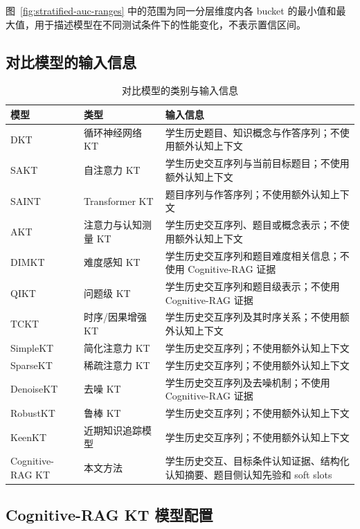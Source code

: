 \documentclass[UTF8,a4paper,12pt]{ctexart}
\numberwithin{table}{section}
\begin{document}
图~\ref{fig:stratified-auc-ranges} 中的范围为同一分层维度内各 bucket 的最小值和最大值，用于描述模型在不同测试条件下的性能变化，不表示置信区间。

\subsection{对比模型的输入信息}

\begin{table}[htbp]
\centering
\small
\caption{对比模型的类别与输入信息}
\label{tab:appendix-comparison-models}
\begin{tabularx}{\textwidth}{p{2.6cm}p{3.3cm}X}
\toprule
\textbf{模型} & \textbf{类型} & \textbf{输入信息} \\
\midrule
DKT & 循环神经网络 KT & 学生历史题目、知识概念与作答序列；不使用额外认知上下文 \\
SAKT & 自注意力 KT & 学生历史交互序列与当前目标题目；不使用额外认知上下文 \\
SAINT & Transformer KT & 题目序列与作答序列；不使用额外认知上下文 \\
AKT & 注意力与认知测量 KT & 学生历史交互序列、题目或概念表示；不使用额外认知上下文 \\
DIMKT & 难度感知 KT & 学生历史交互序列和题目难度相关信息；不使用 Cognitive-RAG 证据 \\
QIKT & 问题级 KT & 学生历史交互序列和题目级表示；不使用 Cognitive-RAG 证据 \\
TCKT & 时序/因果增强 KT & 学生历史交互序列及其时序关系；不使用额外认知上下文 \\
SimpleKT & 简化注意力 KT & 学生历史交互序列；不使用额外认知上下文 \\
SparseKT & 稀疏注意力 KT & 学生历史交互序列；不使用额外认知上下文 \\
DenoiseKT & 去噪 KT & 学生历史交互序列及去噪机制；不使用 Cognitive-RAG 证据 \\
RobustKT & 鲁棒 KT & 学生历史交互序列；不使用额外认知上下文 \\
KeenKT & 近期知识追踪模型 & 学生历史交互序列；不使用额外认知上下文 \\
Cognitive-RAG KT & 本文方法 & 学生历史交互、目标条件认知证据、结构化认知摘要、题目侧认知先验和 soft slots \\
\bottomrule
\end{tabularx}
\end{table}

\subsection{Cognitive-RAG KT 模型配置}
\end{document}
